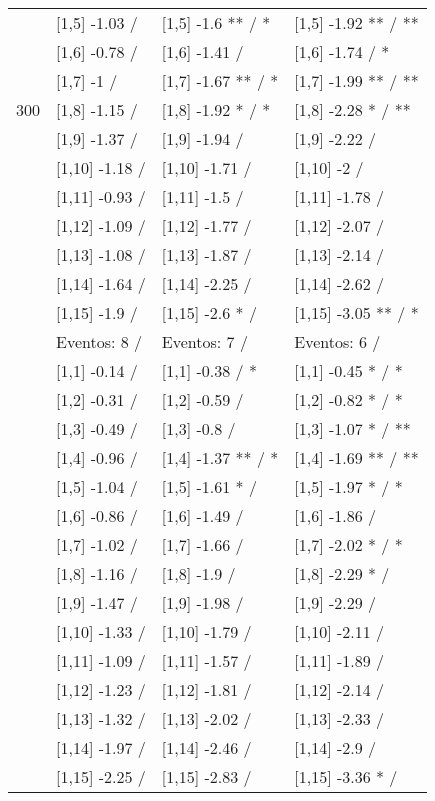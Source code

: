 \begin{table}
\begin{tabular}[t]{llll}
 & {}[1,5] -1.03  / & {}[1,5] -1.6 ** / * & {}[1,5] -1.92 ** / **\\
 & {}[1,6] -0.78  / & {}[1,6] -1.41  / & {}[1,6] -1.74  / *\\
 & {}[1,7] -1  / & {}[1,7] -1.67 ** / * & {}[1,7] -1.99 ** / **\\
300 & {}[1,8] -1.15  / & {}[1,8] -1.92 * / * & {}[1,8] -2.28 * / **\\
\addlinespace
 & {}[1,9] -1.37  / & {}[1,9] -1.94  / & {}[1,9] -2.22  /\\
 & {}[1,10] -1.18  / & {}[1,10] -1.71  / & {}[1,10] -2  /\\
 & {}[1,11] -0.93  / & {}[1,11] -1.5  / & {}[1,11] -1.78  /\\
 & {}[1,12] -1.09  / & {}[1,12] -1.77  / & {}[1,12] -2.07  /\\
 & {}[1,13] -1.08  / & {}[1,13] -1.87  / & {}[1,13] -2.14  /\\
\addlinespace
 & {}[1,14] -1.64  / & {}[1,14] -2.25  / & {}[1,14] -2.62  /\\
 & {}[1,15] -1.9  / & {}[1,15] -2.6 * / & {}[1,15] -3.05 ** / *\\
 & Eventos:  8 / & Eventos:  7 / & Eventos:  6 /\\
 & {}[1,1] -0.14  / & {}[1,1] -0.38  / * & {}[1,1] -0.45 * / *\\
 & {}[1,2] -0.31  / & {}[1,2] -0.59  / & {}[1,2] -0.82 * / *\\
\addlinespace
 & {}[1,3] -0.49  / & {}[1,3] -0.8  / & {}[1,3] -1.07 * / **\\
 & {}[1,4] -0.96  / & {}[1,4] -1.37 ** / * & {}[1,4] -1.69 ** / **\\
 & {}[1,5] -1.04  / & {}[1,5] -1.61 * / & {}[1,5] -1.97 * / *\\
 & {}[1,6] -0.86  / & {}[1,6] -1.49  / & {}[1,6] -1.86  /\\
 & {}[1,7] -1.02  / & {}[1,7] -1.66  / & {}[1,7] -2.02 * / *\\
\addlinespace
500 & {}[1,8] -1.16  / & {}[1,8] -1.9  / & {}[1,8] -2.29 * /\\
 & {}[1,9] -1.47  / & {}[1,9] -1.98  / & {}[1,9] -2.29  /\\
 & {}[1,10] -1.33  / & {}[1,10] -1.79  / & {}[1,10] -2.11  /\\
 & {}[1,11] -1.09  / & {}[1,11] -1.57  / & {}[1,11] -1.89  /\\
 & {}[1,12] -1.23  / & {}[1,12] -1.81  / & {}[1,12] -2.14  /\\
\addlinespace
 & {}[1,13] -1.32  / & {}[1,13] -2.02  / & {}[1,13] -2.33  /\\
 & {}[1,14] -1.97  / & {}[1,14] -2.46  / & {}[1,14] -2.9  /\\
 & {}[1,15] -2.25  / & {}[1,15] -2.83  / & {}[1,15] -3.36 * /\\
\bottomrule
\end{tabular}
\end{table}
